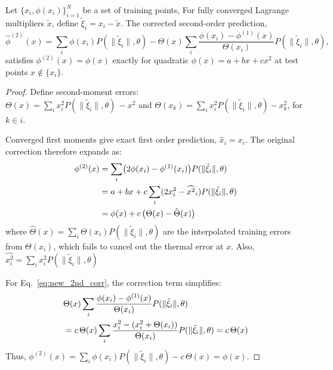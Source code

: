 \documentclass[10pt,a4paper]{amsart}
\begin{document}
\begin{lem}
Let $\{x_i,\phi(x_i)\}_{i=1}^N$ be a set of training points, For fully converged Lagrange multipliers $\tilde{x}$, define $\tilde{\xi}_i = x_i - \tilde{x}$. The corrected second-order prediction,
\begin{equation}\label{eq:new_2nd_corr}
\hat{\phi}^{(2)}(x) = \sum_i \phi(x_i) P(\|\tilde{\xi}_i\|,\theta) 
- \Theta(x) \sum_i \frac{\phi(x_i)-\phi^{(1)}(x)}{\Theta(x_i)} P(\|\tilde{\xi}_i\|,\theta),
\end{equation}
satisfies $\phi^{(2)}(x) = \phi(x)$ exactly for quadratic $\phi(x) = a+bx+cx^2$ at test points $x\notin\{x_i\}$.
\end{lem}

\begin{proof}
Define second-moment errors:\\
$\Theta(x) = \sum_i x_i^2 P(\|\tilde{\xi}_i\|,\theta) \, - x^2$ and $\Theta(x_k) =  \sum_i x_i^2 P(\|\tilde{\xi}_i\|,\theta) - x_k^2$, for $k\in i$. 

Converged first moments give exact first order prediction, $\hat{x}_i = x_i$. The original correction therefore expands as:
\begin{align}
\phi^{(2)}(x) &= \sum_i \bigl(2\phi(x_i) - \phi^{(1)}(x_i)\bigr) P(\|\tilde{\xi}_i\|,\theta) \notag \\
&= a + bx + c\sum_i (2x_i^2 - \widehat{x^2}_i) P(\|\tilde{\xi}_i\|,\theta) \notag\\
&= \phi(x) + c\,\bigl(\Theta(x) - \hat{\Theta}(x)\bigr)
\end{align}
where $\hat{\Theta}(x) = \sum_i \Theta(x_i) P(\|\tilde{\xi}_i\|,\theta)$ are the interpolated training errors from $\Theta(x_i)$, which fails to cancel out the thermal error at $x$. Also, $\widehat{x^2_i} = \sum_i x_i^2 P(\|\tilde{\xi}_i\|,\theta) $

For Eq.~\ref{eq:new_2nd_corr}, the correction term simplifies:
\begin{align}
&\Theta(x) \sum_i \frac{\phi(x_i)-\phi^{(1)}(x)}{\Theta(x_i)} P(\|\tilde{\xi}_i\|,\theta) \notag\\
&= c\,\Theta(x) \sum_i \frac{x_i^2 - (x_i^2 + \Theta(x_i))}{\Theta(x_i)} P(\|\tilde{\xi}_i\|,\theta) = c\,\Theta(x)
\end{align}
Thus, $\phi^{(2)}(x) = \sum_i \phi(x_i) P(\|\tilde{\xi}_i\|,\theta) - c \, \Theta(x) = \phi(x)$.
\end{proof}
\end{document}
